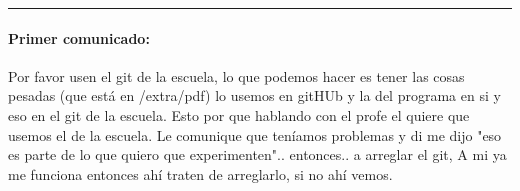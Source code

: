 \documentclass[11pt]{article} %
\begin{document}
\pagestyle{fancy}
\setlength{\headheight}{30pt}
\rule{\linewidth}{0.2mm}
\vspace{10pt}

\paragraph{Primer comunicado:}
Por favor usen el git de la escuela, lo que podemos hacer es tener
las cosas pesadas (que está en /extra/pdf) lo usemos en gitHUb y la del programa en si y eso en el git de la escuela. Esto por que hablando con el profe el quiere que usemos el de la escuela. Le comunique que teníamos problemas y di me dijo "eso es parte de lo que quiero que experimenten".. entonces.. a arreglar el git, A mi ya me funciona entonces ahí traten de arreglarlo, si no ahí vemos.
\end{document}
